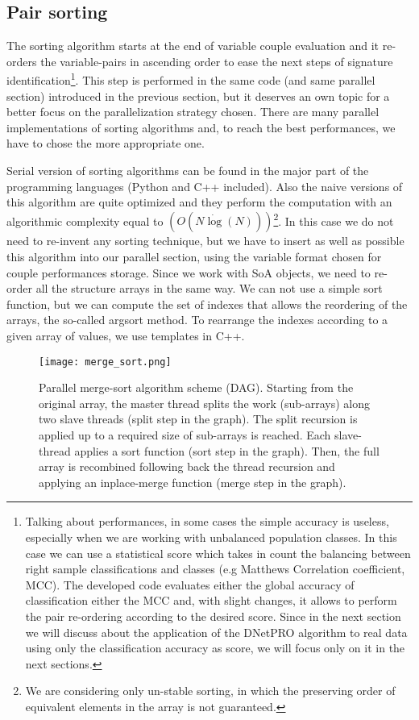 \documentclass{standalone}
\begin{document}
\subsection[Sorting]{Pair sorting}\label{implementation:sort}

The sorting algorithm starts at the end of variable couple evaluation and it re-orders the variable-pairs in ascending order to ease the next steps of signature identification\footnote{
  Talking about performances, in some cases the simple accuracy is useless, especially when we are working with unbalanced population classes.
  In this case we can use a statistical score which takes in count the balancing between right sample classifications and classes (e.g Matthews Correlation coefficient, MCC).
  The developed code evaluates either the global accuracy of classification either the MCC and, with slight changes, it allows to perform the pair re-ordering according to the desired score.
  Since in the next section we will discuss about the application of the \textsf{DNetPRO} algorithm to real data using only the classification accuracy as score, we will focus only on it in the next sections.
}.
This step is performed in the same code (and same parallel section) introduced in the previous section, but it deserves an own topic for a better focus on the parallelization strategy chosen.
There are many parallel implementations of sorting algorithms and, to reach the best performances, we have to chose the more appropriate one.

Serial version of sorting algorithms can be found in the major part of the programming languages (\textsf{Python} and \textsf{C++} included).
Also the naive versions of this algorithm are quite optimized and they perform the computation with an algorithmic complexity equal to $(O(N\dot\log(N)))$\footnote{
  We are considering only un-stable sorting, in which the preserving order of equivalent elements in the array is not guaranteed.
}.
In this case we do not need to re-invent any sorting technique, but we have to insert as well as possible this algorithm into our parallel section, using the variable format chosen for couple performances storage.
Since we work with SoA objects, we need to re-order all the structure arrays in the same way.
We can not use a simple sort function, but we can compute the set of indexes that allows the reordering of the arrays, the so-called \textsf{argsort} method.
To rearrange the indexes according to a given array of values, we use \textsf{template}s in \textsf{C++}.

\begin{figure}[htbp]
\centering
\texttt{[image: merge\_sort.png]}
\caption{Parallel merge-sort algorithm scheme (DAG).
Starting from the original array, the master thread splits the work (sub-arrays) along two slave threads (\textsf{split} step in the graph).
The split recursion is applied up to a required size of sub-arrays is reached.
Each slave-thread applies a sort function (\textsf{sort} step in the graph).
Then, the full array is recombined following back the thread recursion and applying an \textsf{inplace-merge} function (\textsf{merge} step in the graph).
}
\label{fig:merge_sort}
\end{figure}
\end{document}

